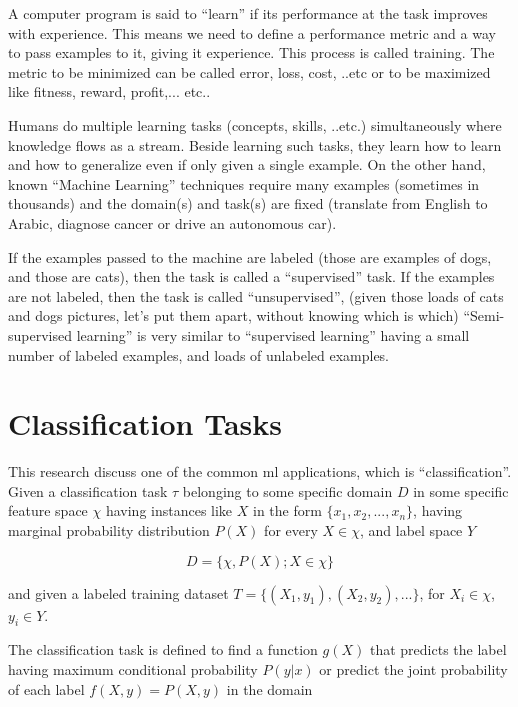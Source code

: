 A computer program is said\autocite{thrun1998learning} to ``learn'' if its performance at the task improves with experience.
This means we need to define a performance metric and a way to pass examples to it, giving it experience.
This process is called training. The metric to be minimized can be called error, loss, cost, ..etc or
to be maximized like fitness, reward, profit,... etc..

Humans do multiple learning tasks (concepts, skills, ..etc.) simultaneously where knowledge flows as a stream.
Beside learning such tasks, they learn how to learn and how to generalize even if only given a single example. 
On the other hand, known ``Machine Learning'' techniques require many examples (sometimes in thousands)
and the domain(s) and task(s) are fixed (translate from English to Arabic, diagnose cancer or drive an autonomous car).

If the examples passed to the machine are labeled (those are examples of dogs, and those are cats),
then the task is called a ``supervised'' task.
If the examples are not labeled, then the task is called ``unsupervised'', 
(given those loads of cats and dogs pictures, let's put them apart, without knowing which is which)
``Semi-supervised learning'' is very similar to ``supervised learning'' having a small number of labeled examples,
and loads of unlabeled examples.



\section{Classification Tasks}

This research discuss one of the common \gls{ml} applications, which is ``classification''.
Given a classification task \( \tau \) belonging to some specific domain \( D \) in some specific feature space \( \chi \)
having instances like \( X \) in the form \( \{x_1, x_2, ..., x_n \} \),
having marginal probability distribution \( P(X) \) for every \( X \in \chi \), 
and label space \( Y \)

\begin{equation}\label{eq_domain}
D = \{ \chi , P(X) ; X \in \chi \}
\end{equation}

and given a labeled training dataset \( T = \{ (X_1, y_1), (X_2, y_2), ... \} \),
for \( X_i \in \chi \), \( y_i \in Y \).

The classification task is defined\autocite{pan2010survey} to find a function \( g(X) \) that predicts the label
having maximum conditional probability \( P(y|x) \) 
or predict the joint probability of each label \( f(X,y) = P(X,y) \) in the domain


